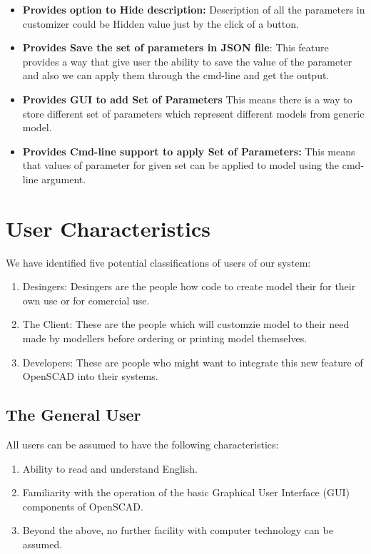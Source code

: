 \begin{itemize}
	\item \textbf{Provides option to Hide description:}
	Description of all the parameters in customizer could be Hidden value just by the click of a button.
	
	\item \textbf{Provides Save the set of parameters in JSON file}:
	This feature provides a way that give user the ability to save the value of the parameter and also we can apply them through the cmd-line and get the output.
	
	\item \textbf{Provides GUI to add Set of Parameters}
	This means there is a way to store different set of parameters which represent different models from generic model.
	
	\item \textbf{Provides Cmd-line support to apply Set of Parameters:}
	This means that values of parameter for given set can be applied to model using the cmd-line argument.
	
	 
\end{itemize}

\section{User Characteristics}

We have identified five potential classifications of users of our system: 

\begin{enumerate}
	\item Desingers: Desingers are the people how code to create model their for their own use or for comercial use.
	\item The Client: These are the people which will customzie model to their need made by modellers before ordering or printing model themselves. 
	\item Developers: These are people who might want to integrate this new feature of OpenSCAD into their systems.
	
\end{enumerate}

\subsection{The General User}

All users can be assumed to have the following characteristics:

\begin{enumerate}
	\item Ability to read and understand English.
	\item Familiarity with the operation of the basic Graphical User Interface (GUI) components of OpenSCAD.
	\item Beyond the above, no further facility with computer technology can be assumed.
\end{enumerate}

